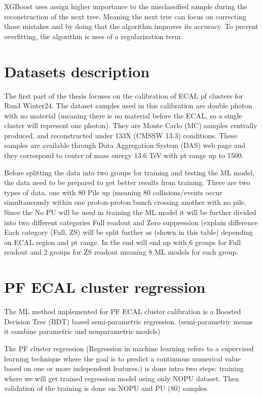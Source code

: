 XGBoost uses assign higher importance to the misclassified sample during the reconstruction of the next tree. Meaning the next tree can focus on correcting those mistakes and by doing that the algorithm improves its accuracy. To prevent overfitting, the algorithm is uses of a regularization term.


\section{Datasets description}

The first part of the thesis focuses on the calibration of ECAL pf clusters for Run3 Winter24. The dataset samples used in this calibration are double photon with no material (meaning there is no material before the ECAL, so a single cluster will represent one photon). They are Monte Carlo (MC) samples centrally produced, and reconstructed under 133X (CMSSW 13.3) conditions. These samples are available through Data Aggregation System (DAS) web page and they correspond to center of mass energy 13.6 TeV with pt range up to 1500.

Before splitting the data into two groups for training and testing the ML model, the data need to be prepared to get better results from training. There are two types of data, one with 80 Pile up (meaning 80 collisions/events occur simultaneously within one proton-proton bunch crossing %
another with no pile. Since the No PU will be used in training the ML model it will be further divided into two different categories Full readout and Zero suppression (explain difference %
Each category (Full, ZS) will be split further as (shown in this table) depending on ECAL region and pt range. In the end will end up with 6 groups for Full readout and 2 groups for ZS readout meaning 8 ML models for each group.  


\section{PF ECAL cluster regression}
The ML method implemented for PF ECAL cluster calibration is a Boosted Decision Tree (BDT) based semi-parametric regression. (semi-parametric means it combine parametric and nonparametric models) %

The PF cluster regression (Regression in machine learning refers to a supervised learning technique where the goal is to predict a continuous numerical value based on one or more independent features.) %
is done intro two steps: training where we will get trained regression model using only NOPU dataset. Then validation of the training is done on NOPU and PU (80) samples.

